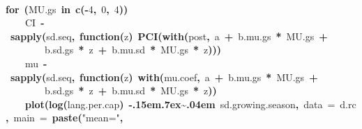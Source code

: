 \documentclass{article}
\makeatletter
\newcommand{\hlnumber}[1]{\textcolor[rgb]{0,0,0}{#1}}%
\newcommand{\hlfunctioncall}[1]{\textcolor[rgb]{.5,0,.33}{\textbf{#1}}}%
\newcommand{\hlstring}[1]{\textcolor[rgb]{.6,.6,1}{#1}}%
\newcommand{\hlkeyword}[1]{\textbf{#1}}%
\newcommand{\hlargument}[1]{\textcolor[rgb]{.69,.25,.02}{#1}}%
\newcommand{\hlformalargs}[1]{\hlargument{#1}}%
\newcommand{\hlassignement}[1]{\textbf{#1}}%
\newcommand{\hlsymbol}[1]{#1}%
\def\urltilda{\kern -.15em\lower .7ex\hbox{\~{}}\kern .04em}%
\newcommand{\hlstd}[1]{\textcolor[rgb]{0,0,0}{#1}}%
\newenvironment{kframe}{%
 \def\FrameCommand##1{\hskip\@totalleftmargin \hskip-\fboxsep
 \colorbox{shadecolor}{##1}\hskip-\fboxsep
     \hskip-\linewidth \hskip-\@totalleftmargin \hskip\columnwidth}%
 \MakeFramed {\advance\hsize-\width
   \@totalleftmargin\z@ \linewidth\hsize
   \@setminipage}}%
 {\par\unskip\endMakeFramed}
\newenvironment{knitrout}{}{} %
\makeatother
\begin{document}
\begin{knitrout}
{\begin{kframe}
\begin{flushleft}
\hlstd{}\hlkeyword{\usebox{\hlnormalsizeboxclosebrace}}\hspace*{\fill}\\
\hlstd{}\hlkeyword{for}{\ }\hlkeyword{(}\hlsymbol{MU.gs}{\ }\hlkeyword{in}{\ }\hlfunctioncall{c}\hlkeyword{(}\hlkeyword{-}\hlnumber{4}\hlkeyword{,}{\ }\hlnumber{0}\hlkeyword{,}{\ }\hlnumber{4}\hlkeyword{)}\hlkeyword{)}{\ }\hlkeyword{\usebox{\hlnormalsizeboxopenbrace}}\hspace*{\fill}\\
\hlstd{}{\ }{\ }{\ }{\ }\hlsymbol{CI}{\ }\hlassignement{\usebox{\hlnormalsizeboxlessthan}-}{\ }\hlfunctioncall{sapply}\hlkeyword{(}\hlsymbol{sd.seq}\hlkeyword{,}{\ }\hlkeyword{function}\hlkeyword{(}\hlformalargs{z}\hlkeyword{)}{\ }\hlfunctioncall{PCI}\hlkeyword{(}\hlfunctioncall{with}\hlkeyword{(}\hlsymbol{post}\hlkeyword{,}{\ }\hlsymbol{a}{\ }\hlkeyword{+}{\ }\hlsymbol{b.mu.gs}{\ }\hlkeyword{*}{\ }\hlsymbol{MU.gs}{\ }\hlkeyword{+}\hspace*{\fill}\\
\hlstd{}{\ }{\ }{\ }{\ }{\ }{\ }{\ }{\ }\hlsymbol{b.sd.gs}{\ }\hlkeyword{*}{\ }\hlsymbol{z}{\ }\hlkeyword{+}{\ }\hlsymbol{b.mu.sd}{\ }\hlkeyword{*}{\ }\hlsymbol{MU.gs}{\ }\hlkeyword{*}{\ }\hlsymbol{z}\hlkeyword{)}\hlkeyword{)}\hlkeyword{)}\hspace*{\fill}\\
\hlstd{}{\ }{\ }{\ }{\ }\hlsymbol{mu}{\ }\hlassignement{\usebox{\hlnormalsizeboxlessthan}-}{\ }\hlfunctioncall{sapply}\hlkeyword{(}\hlsymbol{sd.seq}\hlkeyword{,}{\ }\hlkeyword{function}\hlkeyword{(}\hlformalargs{z}\hlkeyword{)}{\ }\hlfunctioncall{with}\hlkeyword{(}\hlsymbol{mu.coef}\hlkeyword{,}{\ }\hlsymbol{a}{\ }\hlkeyword{+}{\ }\hlsymbol{b.mu.gs}{\ }\hlkeyword{*}{\ }\hlsymbol{MU.gs}{\ }\hlkeyword{+}\hspace*{\fill}\\
\hlstd{}{\ }{\ }{\ }{\ }{\ }{\ }{\ }{\ }\hlsymbol{b.sd.gs}{\ }\hlkeyword{*}{\ }\hlsymbol{z}{\ }\hlkeyword{+}{\ }\hlsymbol{b.mu.sd}{\ }\hlkeyword{*}{\ }\hlsymbol{MU.gs}{\ }\hlkeyword{*}{\ }\hlsymbol{z}\hlkeyword{)}\hlkeyword{)}\hspace*{\fill}\\
\hlstd{}{\ }{\ }{\ }{\ }\hlfunctioncall{plot}\hlkeyword{(}\hlfunctioncall{log}\hlkeyword{(}\hlsymbol{lang.per.cap}\hlkeyword{)}{\ }\hlkeyword{\urltilda{}}{\ }\hlsymbol{sd.growing.season}\hlkeyword{,}{\ }\hlargument{data}{\ }\hlargument{=}{\ }\hlsymbol{d.rc}\hlkeyword{,}{\ }\hlargument{main}{\ }\hlargument{=}{\ }\hlfunctioncall{paste}\hlkeyword{(}\hlstring{"mean="}\hlkeyword{,}\hspace*{\fill}\\

\end{flushleft}
\end{kframe}}
\end{knitrout}
\end{document}
